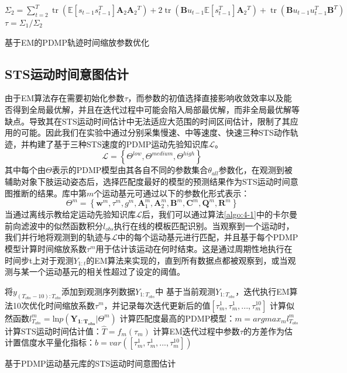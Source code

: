 \begin{algorithm}[h]
{{{            $\Sigma_2=\sum_{t=2}^T \operatorname{tr}\left(\mathbb{E}\left[s_{t-1} s_{t-1}^T\right] \mathbf{A}_2 \mathbf{A}_2{ }^T\right)+2 \operatorname{tr}\left(\mathbf{B} u_{t-1} \mathbb{E}\left[s_{t-1}^T\right] \mathbf{A}_2{ }^T\right)+\operatorname{tr}\left(\mathbf{B} u_{t-1} u_{t-1}^T \mathbf{B}^T\right)$
        }
        $\tau=\Sigma_1 / \Sigma_2$ \;
      }
    }
    \caption{基于EM的PDMP轨迹时间缩放参数优化}
    \label{algo:4-1}
  \end{algorithm}

\subsection{STS运动时间意图估计}
由于EM算法存在需要初始化参数$\tau$，而参数的初值选择直接影响收敛效率以及能否得到全局最优解，并且在迭代过程中可能会陷入局部最优解，而非全局最优解等缺点。导致其在STS运动时间估计中无法适应大范围的时间区间估计，限制了其应用的可能。因此我们在实验中通过分别采集慢速、中等速度、快速三种STS动作轨迹，并构建了基于三种STS速度的PDMP运动先验知识库$\mathscr{L}$。
\begin{equation}
    \mathscr{L}=\left\{\Theta^{low}, \Theta^{medium}, \Theta^{high}\right\}
\end{equation}
其中每个由$\Theta$表示的PDMP模型由其各自不同的参数集合$\theta_{all}$参数化，在观测到被辅助对象下肢运动姿态后，选择匹配度最好的模型的预测结果作为STS运动时间意图推断的结果。库中第$m$个运动基元可通过以下的参数化形式表示：
\begin{equation}
    \Theta ^{m}=\left\{\mathbf{w}^{m}, \tau^{m}, g^{m}, \mathbf{A}_1^{m}, \mathbf{A}_2^{m}, \mathbf{B}^{m}, \mathbf{C}^{m}, \mathbf{Q}^{m}, \mathbf{R}^{m}\right\}
\end{equation}
当通过离线示教给定运动先验知识库$\mathscr{L}$后，我们可以通过算法\ref{algo:4-1}中的卡尔曼前向滤波中的似然函数积分$l_{obs}$执行在线的模板匹配识别。当观察到一个运动时，我们并行地将观测到的轨迹与$\mathscr{L}$中的每个运动基元进行匹配，并且基于每个PDMP模型计算时间缩放系数$\tau^{m}$用于估计该运动在何时结束。这是通过周期性地执行在时间步t上对于观测$Y_{1:t}$的EM算法来实现的，直到所有数据点都被观察到，或当观测与某一个运动基元的相关性超过了设定的阈值。
\begin{algorithm}[h]
    \SetAlgoLined
    {
        将$y_{{(T_{obs}-10)}:T_{obs}}$添加到观测序列数据$Y_{1:T_{obs}}$中 \;
        {
            基于当前观测$Y_{1:T_{obs}}$，迭代执行EM算法10次优化时间缩放系数$\tau^m$，并记录每次迭代更新后的值$[\tau_m^1,\tau_m^1,...,\tau_m^{10}]$\;
            计算似然函数$l_{T_{obs}}^m=\text{ln}p(\mathbf{Y_{1:T_{obs}}}|\Theta ^{m})$ \;
        }
        计算匹配度最高的PDMP模型：$m=argmax_m l_{T_{obs}}^m$\;
        计算STS运动时间估计值：$\hat T = f_m(\tau_m)$\;
        计算EM迭代过程中参数$\tau$的方差作为估计置信度水平量化指标：$b = var([\tau_m^1,\tau_m^1,...,\tau_m^{10}])$\;
    }
    \caption{基于PDMP运动基元库的STS运动时间意图估计}
    \label{algo:4-2}
\end{algorithm}

